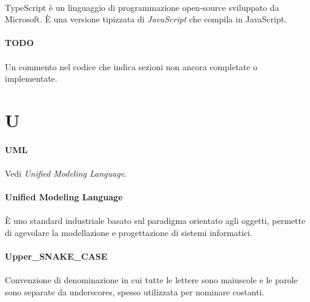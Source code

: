 \documentclass[10pt, a4paper]{article}
\begin{document}
\paragraph{}TypeScript è un linguaggio di programmazione open-source sviluppato da Microsoft. È una versione tipizzata di \textit{JavaScript\pg} che compila in JavaScript.

\vspace{2em}
\paragraph{TODO}\noindent\hrulefill
\paragraph{}Un commento nel codice che indica sezioni non ancora completate o implementate.


\newpage
\section{U}

\vspace{2em}
\paragraph{UML}\noindent\hrulefill 
\paragraph{}Vedi \textit{Unified Modeling Language\pg}.

\vspace{2em}
\paragraph{Unified Modeling Language}\noindent\hrulefill
\paragraph{}È uno standard industriale basato sul paradigma orientato agli oggetti, permette di agevolare la modellazione e progettazione di sistemi informatici.

\vspace{2em}
\paragraph{Upper\_SNAKE\_CASE}\noindent\hrulefill
\paragraph{}Convenzione di denominazione in cui tutte le lettere sono maiuscole e le parole sono separate da underscores, spesso utilizzata per nominare costanti.
\end{document}
